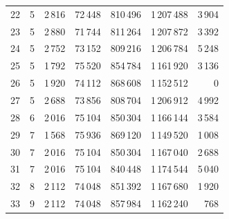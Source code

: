 \begin{center}
\begin{longtable}{r r r r r r r }
22 & 5 & 2\,816 & 72\,448 & 810\,496 & 1\,207\,488 & 3\,904 \\
23 & 5 & 2\,880 & 71\,744 & 811\,264 & 1\,207\,872 & 3\,392 \\
24 & 5 & 2\,752 & 73\,152 & 809\,216 & 1\,206\,784 & 5\,248 \\
25 & 5 & 1\,792 & 75\,520 & 854\,784 & 1\,161\,920 & 3\,136 \\
26 & 5 & 1\,920 & 74\,112 & 868\,608 & 1\,152\,512 & 0 \\
27 & 5 & 2\,688 & 73\,856 & 808\,704 & 1\,206\,912 & 4\,992 \\
28 & 6 & 2\,016 & 75\,104 & 850\,304 & 1\,166\,144 & 3\,584 \\
29 & 7 & 1\,568 & 75\,936 & 869\,120 & 1\,149\,520 & 1\,008 \\
30 & 7 & 2\,016 & 75\,104 & 850\,304 & 1\,167\,040 & 2\,688 \\
31 & 7 & 2\,016 & 75\,104 & 840\,448 & 1\,174\,544 & 5\,040 \\
32 & 8 & 2\,112 & 74\,048 & 851\,392 & 1\,167\,680 & 1\,920 \\
33 & 9 & 2\,112 & 74\,048 & 857\,984 & 1\,162\,240 & 768 \\
\bottomrule
\end{longtable}
\end{center}
